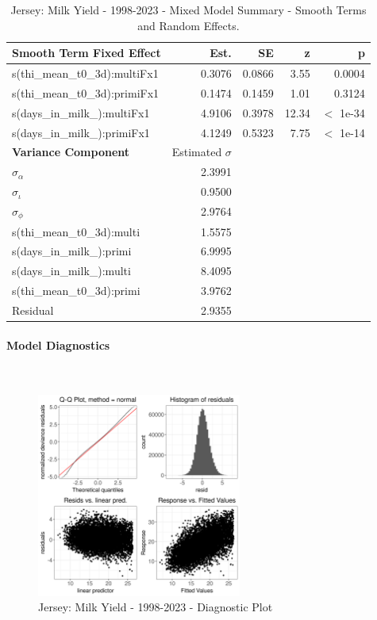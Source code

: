 \newpage
\begin{table}[H]
\centering
\begin{tabular}
{l | r | r | r | r}
\textbf{Smooth Term Fixed Effect} & Est. & SE & z & p\\
\hline
\hline
s(thi\_mean\_t0\_3d):multiFx1& 0.3076 & 0.0866 & 3.55 & 0.0004\\
s(thi\_mean\_t0\_3d):primiFx1 & 0.1474 & 0.1459 & 1.01 & 0.3124\\
s(days\_in\_milk\_):multiFx1 & 4.9106 & 0.3978 & 12.34 & $<$ 1e-34\\
s(days\_in\_milk\_):primiFx1 & 4.1249 & 0.5323 & 7.75 & $<$ 1e-14\\
\hline
\textbf{Variance Component} & Estimated $\sigma$ & & & \\
\hline
\hline
$\sigma_\alpha$ & 2.3991 & &  & \\
$\sigma_\iota$ & 0.9500 & & & \\
$\sigma_\phi$ & 2.9764 & & & \\
s(thi\_mean\_t0\_3d):multi & 1.5575 & & & \\
s(days\_in\_milk\_):primi & 6.9995 & & & \\
s(days\_in\_milk\_):multi & 8.4095 & & & \\
s(thi\_mean\_t0\_3d):primi & 3.9762 & & & \\
Residual & 2.9355 & & & \\
\end{tabular}
\caption[]{Jersey: Milk Yield - 1998-2023 - Mixed Model Summary - Smooth Terms and Random Effects.}
\end{table}

\paragraph{Model Diagnostics} \quad \\
\begin{figure}[H]
    \centering
    \includegraphics[width=0.6\textwidth]{thesis/figures/models/milk/full/je_milk_full/je_milk_full_diagnostics.png}
    \caption[]{Jersey: Milk Yield - 1998-2023 - Diagnostic Plot}
\end{figure}

